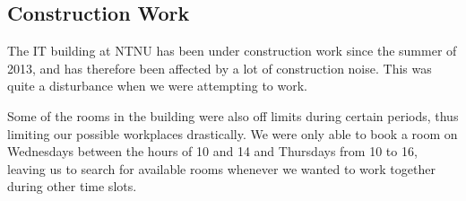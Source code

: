 \subsection{Construction Work}
The IT building at NTNU has been under construction work since the summer of 2013, and has therefore been affected by a lot of construction noise. This was quite a disturbance when we were attempting to work.

Some of the rooms in the building were also off limits during certain periods, thus limiting our possible workplaces drastically. We were only able to book a room on Wednesdays between the hours of 10 and 14 and Thursdays from 10 to 16, leaving us to search for available rooms whenever we wanted to work together during other time slots.


